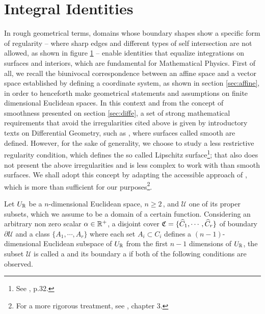 \section{Integral Identities}

In rough geometrical terms, domains whose boundary shapes show a specific form of regularity -- where sharp edges and different types of self intersection are not allowed, as shown in figure \ref{fg:naoRegulares} -- enable identities that equalize integrations on surfaces and interiors, which are fundamental for Mathematical Physics. First of all, we recall the biunivocal correspondence between an affine space and a vector space established by defining a coordinate system, as shown in section \ref{sec:affine}, in order to henceforth make geometrical statements and assumptions on finite dimensional Euclidean spaces. In this context and from the concept of smoothness presented on section \ref{sec:diffe}, a set of strong mathematical requirements that avoid the irregularities cited above is given by introductory texts on Differential Geometry, such as \cite{docarmo_2016}, where surfaces called smooth are defined. However, for the sake of generality, we choose to study a less restrictive regularity condition, which defines the so called Lipschitz surface\footnote{ See \cite{ciarlet_1988_2}, p.32.}; that also does not present the above irregularities and is less complex to work with than smooth surfaces. We shall adopt this concept by adapting the accessible approach of \cite{adams_2003_2}, which is more than sufficient for our purposes\footnote{For a more rigorous treatment, see \cite{agranovitch_2015_1}, chapter 3.}.


\begin{figure}[!ht]
	\centering
	\begin{center}
		\scalebox{.72}{}
	\end{center}
	\label{fg:naoRegulares}
\end{figure}


Let $U_{\mathbb{R}}$ be a $n$-dimensional Euclidean space, $n\geqslant 2\,$, and $\pmb{\mathcal{U}}$ one of its proper subsets, which we assume to be a domain of a certain function. Considering an arbitrary non zero scalar $\alpha\in\mathbb{R}^+$, a disjoint cover $\mathfrak{C}=\{\widehat{C}_1,\cdots,\widehat{C}_r\}$ of boundary $\partial\pmb{\mathcal{U}}$ and a class $\{A_1,\cdots,A_r\}$ where each set $A_i\subset C_i$ defines a $(n-1)$-dimensional Euclidean subspace of $U_{\mathbb{R}}$ from the first $n-1$ dimensions of $U_{\mathbb{R}}$, the subset $\pmb{\mathcal{U}}$ is called a  and its boundary a  if both of the following conditions are observed.

